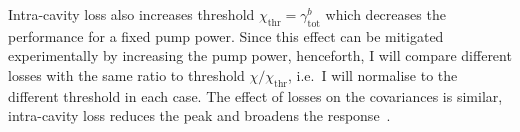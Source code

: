 Intra-cavity loss also increases threshold $\chi_\text{thr}=\gamma^b_\text{tot}$ which decreases the performance for a fixed pump power. Since this effect can be mitigated experimentally by increasing the pump power, henceforth, I will compare different losses with the same ratio to threshold $\chi/\chi_\text{thr}$, i.e.\ I will normalise to the different threshold in each case. %
The effect of losses on the covariances is similar, intra-cavity loss reduces the peak and broadens the response~\cite{}.




